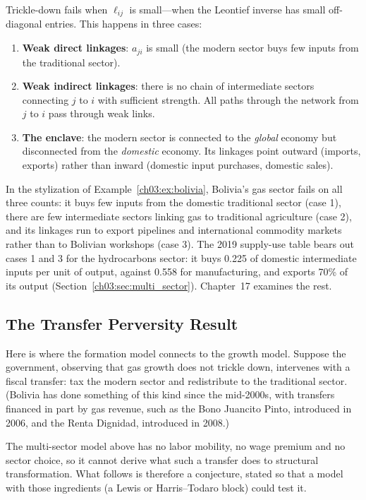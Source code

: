 \documentclass[../structural_economics_book.tex]{subfiles}
\begin{document}
\begin{intuition}
Trickle-down fails when $\ell_{ij}$ is small---when the Leontief inverse has small off-diagonal entries. This happens in three cases:
\begin{enumerate}
\item \textbf{Weak direct linkages}: $a_{ji}$ is small (the modern sector buys few inputs from the traditional sector).
\item \textbf{Weak indirect linkages}: there is no chain of intermediate sectors connecting $j$ to $i$ with sufficient strength. All paths through the network from $j$ to $i$ pass through weak links.
\item \textbf{The enclave}: the modern sector is connected to the \textit{global} economy but disconnected from the \textit{domestic} economy. Its linkages point outward (imports, exports) rather than inward (domestic input purchases, domestic sales).
\end{enumerate}

In the stylization of Example~\ref{ch03:ex:bolivia}, Bolivia's gas sector fails on all three counts: it buys few inputs from the domestic traditional sector (case 1), there are few intermediate sectors linking gas to traditional agriculture (case 2), and its linkages run to export pipelines and international commodity markets rather than to Bolivian workshops (case 3). The 2019 supply-use table bears out cases 1 and 3 for the hydrocarbons sector: it buys 0.225 of domestic intermediate inputs per unit of output, against 0.558 for manufacturing, and exports 70\% of its output (Section~\ref{ch03:sec:multi_sector}). Chapter~17 examines the rest.
\end{intuition}

\subsection{The Transfer Perversity Result}

Here is where the formation model connects to the growth model. Suppose the government, observing that gas growth does not trickle down, intervenes with a fiscal transfer: tax the modern sector and redistribute to the traditional sector. (Bolivia has done something of this kind since the mid-2000s, with transfers financed in part by gas revenue, such as the Bono Juancito Pinto, introduced in 2006, and the Renta Dignidad, introduced in 2008.)

The multi-sector model above has no labor mobility, no wage premium and no sector choice, so it cannot derive what such a transfer does to structural transformation. What follows is therefore a conjecture, stated so that a model with those ingredients (a Lewis or Harris--Todaro block) could test it.
\end{document}
